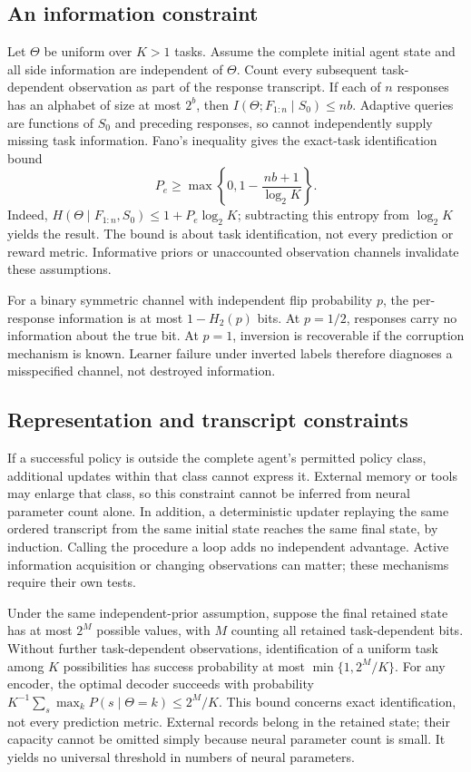 \documentclass[11pt]{article}
\begin{document}
\subsection{An information constraint}
Let $\Theta$ be uniform over $K>1$ tasks. Assume the complete initial agent
state and all side information are independent of $\Theta$. Count every
subsequent task-dependent observation as part of the response transcript.
If each of $n$ responses has an alphabet of size at most $2^b$, then
$I(\Theta;F_{1:n}\mid S_0)\leq nb$. Adaptive queries are functions of
$S_0$ and preceding responses, so cannot independently supply missing task
information. Fano's inequality gives the exact-task identification bound
\[
 P_e\geq \max\left\{0,1-\frac{nb+1}{\log_2 K}\right\}.
\]
Indeed, $H(\Theta\mid F_{1:n},S_0)\leq 1+P_e\log_2 K$; subtracting
this entropy from $\log_2 K$ yields the result. The bound is about task
identification, not every prediction or reward metric. Informative priors or
unaccounted observation channels invalidate these assumptions.

For a binary symmetric channel with independent flip probability $p$, the
per-response information is at most $1-H_2(p)$ bits. At $p=1/2$, responses
carry no information about the true bit. At $p=1$, inversion is recoverable
if the corruption mechanism is known. Learner failure under inverted labels
therefore diagnoses a misspecified channel, not destroyed information.

\subsection{Representation and transcript constraints}
If a successful policy is outside the complete agent's permitted policy class,
additional updates within that class cannot express it. External memory or
tools may enlarge that class, so this constraint cannot be inferred from
neural parameter count alone. In addition, a deterministic updater replaying
the same ordered transcript from the same initial state reaches the same
final state, by induction. Calling the procedure a loop adds no independent
advantage. Active information acquisition or changing observations can matter;
these mechanisms require their own tests.

Under the same independent-prior assumption, suppose the final retained state has at
most $2^M$ possible values, with $M$ counting all retained task-dependent bits.
Without further task-dependent observations, identification of a uniform task
among $K$ possibilities has success probability at most
$\min\{1,2^M/K\}$. For any encoder, the optimal decoder succeeds with probability
$K^{-1}\sum_s\max_k P(s\mid\Theta=k)\leq 2^M/K$.
This bound concerns exact identification, not every prediction metric. External
records belong in the retained state; their capacity cannot be omitted simply
because neural parameter count is small. It yields no universal threshold in
numbers of neural parameters.
\end{document}
